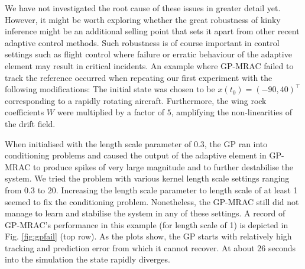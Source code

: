 We have not investigated the root cause of these issues in greater detail yet. However, it might be worth exploring whether the great robustness of kinky inference might be an additional selling point that sets it apart from other recent adaptive control methods. Such robustness is of course important in control settings such as flight control where failure or erratic behaviour of the adaptive element may result in critical incidents. 
%
An example where GP-MRAC failed to track the reference occurred when repeating our first experiment  with the following modifications: The initial state was chosen to be $x(t_0) = (-90,40)^\top$ corresponding to a rapidly rotating aircraft. Furthermore, the wing rock coefficients $W$ were multiplied by a factor of $5$, amplifying the non-linearities of the drift field. 

When initialised with the length scale parameter of 0.3, the GP ran into conditioning problems and caused the output of the adaptive element in GP-MRAC to produce spikes of very large magnitude and to further destabilise the system. We tried the problem with various kernel length scale settings ranging from $0.3$ to $20$. Increasing the length scale parameter to length scale of at least 1 seemed to fix the conditioning problem. Nonetheless, the GP-MRAC still did not manage to learn and stabilise the system in any of these settings. A record of GP-MRAC's performance in this example (for length scale of 1) is depicted in  Fig. \ref{fig:gpfail} (top row). As the plots show, the GP starts with relatively high tracking and prediction error from which it cannot recover. At about 26 seconds into the simulation the state rapidly diverges.

